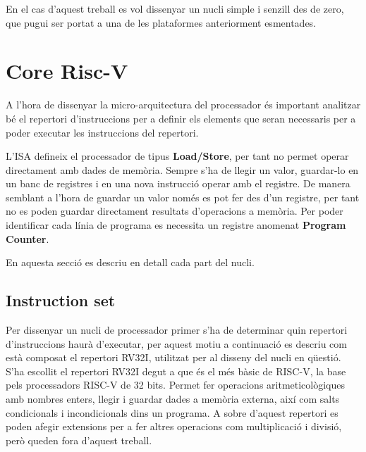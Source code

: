 \documentclass[10pt,a4paper,twocolumn,twoside]{article}
\begin{document}
En el cas d'aquest treball es vol dissenyar un nucli simple i senzill des de zero, que pugui ser portat a una de les plataformes anteriorment esmentades.

\section{Core Risc-V}
    A l'hora de dissenyar la micro-arquitectura del processador és important analitzar bé el repertori d'instruccions per a definir els elements que seran necessaris per a poder executar les instruccions del repertori.
    
    L'ISA defineix el processador de tipus \textbf{Load/Store}, per tant no permet operar directament amb dades de memòria. 
    Sempre s'ha de llegir un valor, guardar-lo en un banc de registres i en una nova instrucció operar amb el registre.
    De manera semblant a l'hora de guardar un valor només es pot fer des d'un registre, per tant no es poden guardar directament resultats d'operacions a memòria.
    Per poder identificar cada línia de programa es necessita un registre anomenat\textbf{ Program Counter}.

En aquesta secció es descriu en detall cada part del nucli. 
    \subsection{Instruction set}
    Per dissenyar un nucli de processador primer s'ha de determinar quin repertori d'instruccions haurà d'executar, per aquest motiu a continuació es descriu com està composat el repertori RV32I, utilitzat per al disseny del nucli en qüestió.
    S'ha escollit el repertori RV32I degut a que és el més bàsic de RISC-V, la base pels processadors RISC-V de 32 bits. Permet fer operacions aritmeticològiques amb nombres enters, llegir i guardar dades a memòria externa, així com salts condicionals i incondicionals dins un programa. A sobre d'aquest repertori es poden afegir extensions per a fer altres operacions com multiplicació i divisió, però queden fora d'aquest treball. 
        
    
    
\end{document}

